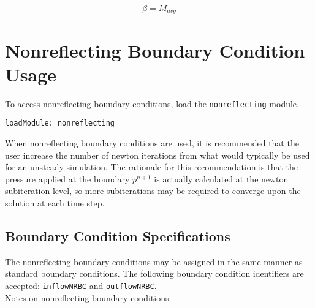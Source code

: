 \documentclass{article}
\begin{document}
\begin{equation}
\beta = M_{avg}
\end{equation}


\section{Nonreflecting Boundary Condition Usage}

To access nonreflecting boundary conditions, load the {\tt nonreflecting} module.

\begin{verbatim}
loadModule: nonreflecting
\end{verbatim}

When nonreflecting boundary conditions are used, it is recommended that the user increase the number of newton iterations from what would typically be used for an unsteady simulation. The rationale for this recommendation is that the pressure applied at the boundary {\tt $p^{n+1}$} is actually calculated at the newton subiteration level, so more subiterations may be required to converge upon the solution at each time step.

\subsection{Boundary Condition Specifications}


The nonreflecting boundary conditions may be assigned in the same manner as standard boundary conditions. The following boundary condition identifiers are accepted:
  {\tt inflowNRBC} and {\tt outflowNRBC}. \\

  
  Notes on nonreflecting boundary conditions:
\end{document}
